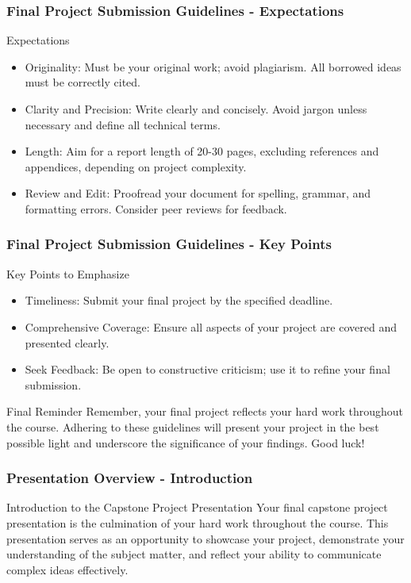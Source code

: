 \documentclass[aspectratio=169]{beamer}
\begin{document}
\begin{frame}[fragile]
  \frametitle{Final Project Submission Guidelines - Expectations}
  \begin{block}{Expectations}
    \begin{itemize}
      \item Originality: Must be your original work; avoid plagiarism. All borrowed ideas must be correctly cited.
      \item Clarity and Precision: Write clearly and concisely. Avoid jargon unless necessary and define all technical terms.
      \item Length: Aim for a report length of 20-30 pages, excluding references and appendices, depending on project complexity.
      \item Review and Edit: Proofread your document for spelling, grammar, and formatting errors. Consider peer reviews for feedback.
    \end{itemize}
  \end{block}
\end{frame}

\begin{frame}[fragile]
  \frametitle{Final Project Submission Guidelines - Key Points}
  \begin{block}{Key Points to Emphasize}
    \begin{itemize}
      \item Timeliness: Submit your final project by the specified deadline.
      \item Comprehensive Coverage: Ensure all aspects of your project are covered and presented clearly.
      \item Seek Feedback: Be open to constructive criticism; use it to refine your final submission.
    \end{itemize}
  \end{block}
  
  \begin{block}{Final Reminder}
    Remember, your final project reflects your hard work throughout the course. Adhering to these guidelines will present your project in the best possible light and underscore the significance of your findings. Good luck!
  \end{block}
\end{frame}

\begin{frame}[fragile]
    \frametitle{Presentation Overview - Introduction}
    \begin{block}{Introduction to the Capstone Project Presentation}
        Your final capstone project presentation is the culmination of your hard work throughout the course. 
        This presentation serves as an opportunity to showcase your project, demonstrate your understanding of the subject matter, 
        and reflect your ability to communicate complex ideas effectively.
    \end{block}
\end{frame}
\end{document}
